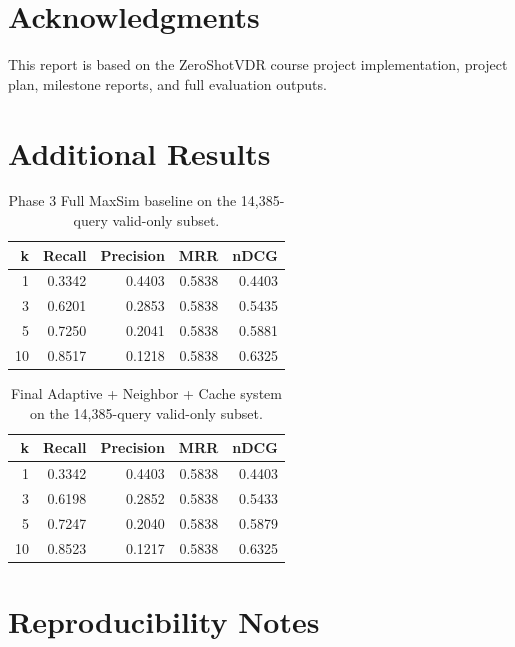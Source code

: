 \documentclass[11pt]{article}
\begin{document}
\section*{Acknowledgments}

This report is based on the ZeroShotVDR course project implementation, project plan, milestone reports, and full evaluation outputs.




\appendix

\section{Additional Results}

\begin{table}[h]
\centering
\small
\begin{tabular}{rrrrr}
\toprule
k & Recall & Precision & MRR & nDCG \\
\midrule
1 & 0.3342 & 0.4403 & 0.5838 & 0.4403 \\
3 & 0.6201 & 0.2853 & 0.5838 & 0.5435 \\
5 & 0.7250 & 0.2041 & 0.5838 & 0.5881 \\
10 & 0.8517 & 0.1218 & 0.5838 & 0.6325 \\
\bottomrule
\end{tabular}
\caption{Phase 3 Full MaxSim baseline on the 14,385-query valid-only subset.}
\label{tab:appendix-baseline}
\end{table}

\begin{table}[h]
\centering
\small
\begin{tabular}{rrrrr}
\toprule
k & Recall & Precision & MRR & nDCG \\
\midrule
1 & 0.3342 & 0.4403 & 0.5838 & 0.4403 \\
3 & 0.6198 & 0.2852 & 0.5838 & 0.5433 \\
5 & 0.7247 & 0.2040 & 0.5838 & 0.5879 \\
10 & 0.8523 & 0.1217 & 0.5838 & 0.6325 \\
\bottomrule
\end{tabular}
\caption{Final Adaptive + Neighbor + Cache system on the 14,385-query valid-only subset.}
\label{tab:appendix-final}
\end{table}

\section{Reproducibility Notes}
\end{document}
